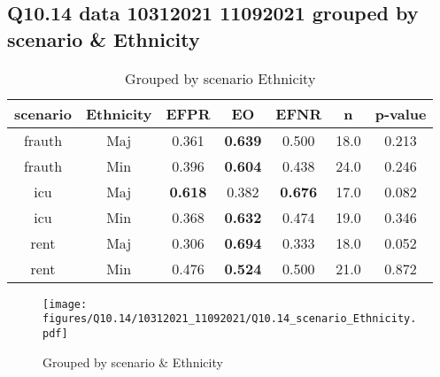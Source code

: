 \subsection{Q10.14 data 10312021 11092021 grouped by scenario \& Ethnicity}

\begin{comment}
                   EFPR        EO      EFNR     n    pvalue
(frauth, Maj)  0.361111  0.638889  0.500000  18.0  0.212946
(frauth, Min)  0.395833  0.604167  0.437500  24.0  0.246426
(icu, Maj)     0.617647  0.382353  0.676471  17.0  0.081792
(icu, Min)     0.368421  0.631579  0.473684  19.0  0.345765
(rent, Maj)    0.305556  0.694444  0.333333  18.0  0.051938
(rent, Min)    0.476190  0.523810  0.500000  21.0  0.871719
\end{comment}

\begin{table}[h]
    \centering
    \begin{tabular}{|c|c|c|c|c|c|c|}
        \hline
        scenario & Ethnicity & EFPR & EO & EFNR & n & p-value\\
        \hline
        frauth & Maj & 0.361 & \textbf{0.639} & 0.500 & 18.0 & 0.213\\
		frauth & Min & 0.396 & \textbf{0.604} & 0.438 & 24.0 & 0.246\\
		icu & Maj & \textbf{0.618} & 0.382 & \textbf{0.676} & 17.0 & 0.082\\
		icu & Min & 0.368 & \textbf{0.632} & 0.474 & 19.0 & 0.346\\
		rent & Maj & 0.306 & \textbf{0.694} & 0.333 & 18.0 & 0.052\\
		rent & Min & 0.476 & \textbf{0.524} & 0.500 & 21.0 & 0.872\\
		
        \hline
    \end{tabular}
    \caption{Grouped by scenario Ethnicity}
    \label{tab:my_label}
\end{table}
\begin{figure}[h]
    \centering
    \texttt{[image: figures/Q10.14/10312021\_11092021/Q10.14\_scenario\_Ethnicity.pdf]}
    \caption{Grouped by scenario \& Ethnicity}
    \label{fig:my_label}
\end{figure}
